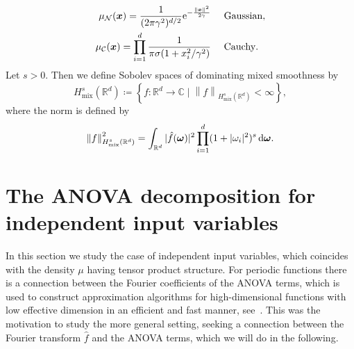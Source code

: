 \documentclass{article}
\renewcommand{\vec}[1]{\ensuremath \mathbf{\boldsymbol{#1}}}
\newcommand{\w}{\ensuremath{\vec \omega}}
\newcommand{\G}{\ensuremath{\mathcal{N}}} %
\newcommand{\x}{\ensuremath{\vec x}}
\newcommand{\R}{\ensuremath{\mathbb{R}}}
\newcommand{\C}{\ensuremath{\mathbb{C}}}
\newcommand{\e}{\mathrm{e}}
\newcommand{\mix}{\mathrm{mix}}
\renewcommand{\d}{\, \mathrm{d}}
\newcommand{\norm}[1]{\left\lVert {#1} \right\rVert}    %
\theoremstyle{definition}
\numberwithin{equation}{section}
\begin{document}
\begin{align*}
\mu_{\G}(\x) = \frac{1}{(2\pi\gamma^2)^{d/2}} \e^{-\frac{\norm{\x}^2}{2\gamma}}&\quad \text{ Gaussian},\\
\mu_{\mathcal C}(\x)	 = \prod_{i = 1}^d \frac{1}{\pi \sigma (1+x_{i}^2/\gamma^2)}	&\quad \text{ Cauchy}.
\end{align*}
Let $s>0$. Then we define Sobolev spaces of dominating mixed smoothness by
\begin{equation}\label{eq:Hsmix_R}
H^s_{\mix}(\R^d)\coloneqq\left\{f\colon\R^d\to \C\mid \norm{f}_{H^s_{\mix}(\R^d)}<\infty\right\},
\end{equation}
where the norm is defined by
\begin{equation*}
\norm{f}_{H^s_{\mix}(\R^d)}^2=\int_{\R^d} |\hat{f}(\w) |^2\prod_{i=1}^d(1+|\omega_i|^2)^{s} \d \vec \omega.
\end{equation*}




\section{The ANOVA decomposition for independent input variables}\label{sec:ANOVA_independent}
In this section we study the case of independent input variables, which coincides with the density $\mu$ having tensor product structure.  
For periodic functions there is a connection between the Fourier coefficients of the ANOVA terms, which is used to construct approximation algorithms for high-dimensional functions with low effective dimension in an efficient and fast manner, see~\cite{PoSc19a}. This was the motivation to study the more general setting, seeking a connection between the Fourier transform $\hat f$ and the ANOVA terms, which we will do in the following.\par
\end{document}
